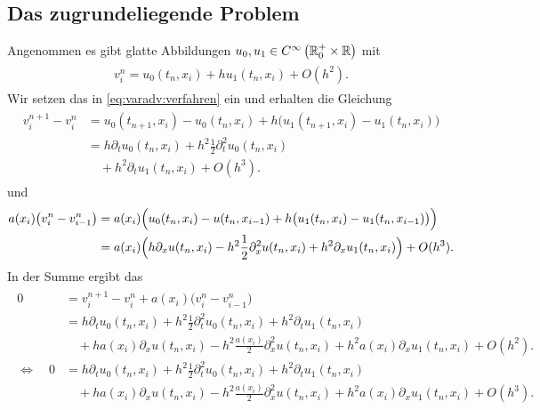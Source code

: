 
\subsection*{Das zugrundeliegende Problem}

Angenommen es gibt glatte Abbildungen $u_0, u_1 \in C^{\infty}\left( \mathbb R^+_0 \times \mathbb R \right)$ mit
\begin{align}\label{eq:varadv:reg:ansatz}
\begin{split}
v^n_i = u_0(t_n, x_i) + h u_1(t_n, x_i) + O(h^2).
\end{split}
\end{align}
Wir setzen das in \eqref{eq:varadv:verfahren} ein und erhalten die Gleichung
\begin{align}
\begin{split}
v^{n+1}_i - v^n_i &= u_0(t_{n+1}, x_i) - u_0(t_n, x_i) + h \bigl( u_1(t_{n+1}, x_i) - u_1(t_n, x_i) \bigr)\\
&= h \partial_t u_0(t_n, x_i) + h^2 \frac{1}{2} \partial^2_t u_0(t_n, x_i)\\
&\quad + h^2  \partial_t u_1(t_n, x_i) + O(h^3).
\end{split}
\end{align}
und
\begin{align}
\begin{split}
a(x_i) \bigl( v^n_i - v^n_{i-1} \bigr) &= a(x_i) \Bigl( u_0(t_n, x_i) - u(t_n, x_{i-1}) + h \bigl( u_1(t_n, x_i) - u_1(t_n, x_{i-1}) \bigr) \Bigr)\\
&= a(x_i)  \Bigl( h \partial_x u(t_n, x_i) - h^2 \frac{1}{2} \partial^2_x u(t_n, x_i) + h^2 \partial_x u_1(t_n, x_i) \Bigr) + O(h^3).
\end{split}
\end{align}
In der Summe ergibt das
\begin{align}
\begin{split}
0 &= v^{n+1}_i - v^n_i + a(x_i)  \bigl( v^n_i - v^n_{i-1} \bigr)\\
&=  h \partial_t u_0(t_n, x_i) + h^2 \frac{1}{2} \partial^2_t u_0(t_n, x_i) + h^2  \partial_t u_1(t_n, x_i)\\
&\quad + h a(x_i)  \partial_x u(t_n, x_i) - h^2 \frac{a(x_i) }{2} \partial^2_x u(t_n, x_i) + h^2 a(x_i)  \partial_x u_1(t_n, x_i) + O(h^2).\\
\Leftrightarrow \quad 0 &= h \partial_t u_0(t_n, x_i) + h^2 \frac{1}{2} \partial^2_t u_0(t_n, x_i) + h^2 \partial_t u_1(t_n, x_i)\\
&\quad + h a(x_i) \partial_x u(t_n, x_i) - h^2 \frac{a(x_i)}{2} \partial^2_x u(t_n, x_i) + h^2 a(x_i) \partial_x u_1(t_n, x_i) + O(h^3).
\end{split}
\end{align}
